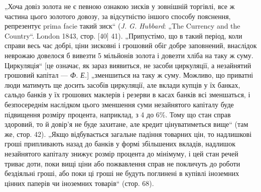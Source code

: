 „Хоча довіз золота не є певною ознакою зисків у зовнішній
торгівлі, все ж частина цього золотого довозу, за відсутністю
іншого способу пояснення, репрезентує prima facie такий зиск“
(\emph{J. G. Hubbard}: „The Currency and the Country“. London 1843,
стор. [40] 41). „Припустімо, що в такий період, коли справи
весь час добрі, ціни зисковні і грошовий обіг добре заповнений,
внаслідок неврожаю довелося б вивезти 5 мільйонів
золота і довезти хліба на таку ж суму. Циркуляція“ [це означає, як зараз виявиться, не засоби
циркуляції, а незайнятий грошовий капітал — \emph{Ф. Е.}] „зменшиться на таку ж суму. Можливо, що приватні
люди матимуть ще досить засобів циркуляції,
але вклади купців у їх банках, сальдо банків у їх грошових маклерів і резерви в касах банків всі
зменшаться, і безпосереднім
наслідком цього зменшення суми незайнятого капіталу буде підвищення розміру процента, наприклад, з 4
до 6\%. Тому що стан
справ здоровий, то й довір’я не буде захитане, але кредит цінуватиметься вище“ (там же, стор. 42).
„Якщо відбувається загальне
падіння товарних цін, то надлишкові гроші припливають назад
до банків у формі збільшених вкладів, надлишок незайнятого капіталу знижує розмір процента до
мінімуму, і цей стан речей
триває доти, поки вищі ціни або пожвавлення справ не покличуть
до роботи бездіяльні гроші, або поки ці гроші не будуть поглинені в купівлі іноземних цінних паперів
чи іноземних товарів“ (стор. 68).


